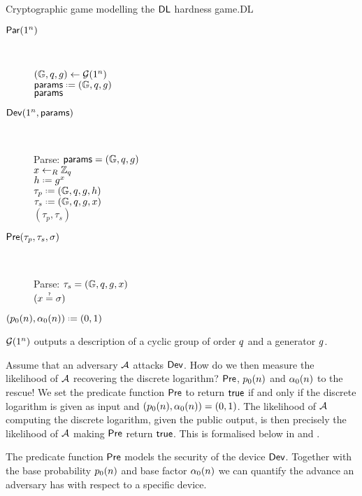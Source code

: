 \begin{boxfigGame}{Cryptographic game modelling the $\mathsf{DL}$ hardness game.}{DL}
  \begin{description}
  	\item[\underline{$\operatorname{\mathsf{Par}}(1^n)$}] ~ 
  	
		$(\mathbb{G},q,g)\leftarrow\operatorname{\mathcal{G}}(1^n)$ \\
		$\params \defeq (\cgroup,q,g)$ \\
		\Ret $\mathsf{params}$ 	
  	
 	\item[\underline{$\operatorname{\mathsf{Dev}}(1^n,\mathsf{params})$}] ~
 	
 		Parse: $\mathsf{params} = (\mathbb{G},q,g)$ \\
 		$x\leftarrow_R\mathbb{Z}_q$ \\
 		$h\defeq g^x$ \\
 		$\tau_p\defeq(\cgroup,\order,\generator,h)$ \\
 		$\tau_s\defeq (\cgroup,\order,\generator,x)$ \\
 		\Ret $(\tau_p,\tau_s)$

	\item[\underline{$\operatorname{\mathsf{Pre}}(\tau_p,\tau_s,\sigma)$}] ~
	
		Parse: $\tau_s=(\mathbb{G},q,g,x)$ \\
		\Ret $\askequal{x}{\sigma}$
		
	\item[\underline{$(\basep(n),\secf(n)) \defeq (0,1)$}]
  \end{description}
  $\operatorname{\mathcal{G}}(1^n)$ outputs a description of a cyclic group of order $q$ and a generator $g$. 
\end{boxfigGame}

Assume that an adversary $\mathcal{A}$ attacks $\operatorname{\mathsf{Dev}}$. How do we then measure the likelihood of $\mathcal{A}$ recovering the discrete logarithm? $\operatorname{\mathsf{Pre}}$, $p_{0}(n)$ and $\alpha_{0}(n)$ to the rescue! We set the predicate function $\operatorname{\mathsf{Pre}}$ to return $\mathsf{true}$ if and only if the discrete logarithm is given as input and $(p_{0}(n),\alpha_{0}(n))=(0,1)$. The likelihood of $\mathcal{A}$ computing the discrete logarithm, given the public output, is then precisely the likelihood of $\mathcal{A}$ making $\operatorname{\mathsf{Pre}}$ return $\mathsf{true}$. This is formalised below in  and . 

The predicate function $\operatorname{\mathsf{Pre}}$ models the security of the device $\operatorname{\mathsf{Dev}}$. Together with the base probability $p_{0}(n)$ and base factor $\alpha_{0}(n)$ we can quantify the advance an adversary has with respect to a specific device. 

